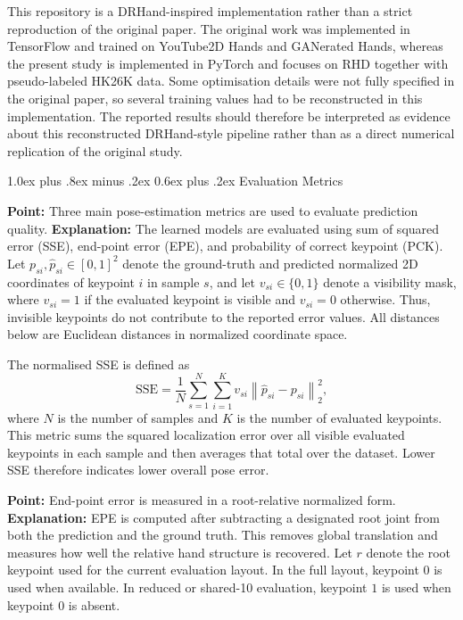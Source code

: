 \documentclass[10pt,letterpaper]{article}
\makeatletter
\renewcommand\subsection{\@startsection{subsection}{2}{\z@}%
  {1.0ex plus .8ex minus .2ex}%
  {0.6ex plus .2ex}%
  {\normalfont\itshape}}
\makeatother
\begin{document}
\noindent This repository is a DRHand-inspired implementation rather than a strict reproduction of the original paper. The original work was implemented in TensorFlow and trained on YouTube2D Hands and GANerated Hands, whereas the present study is implemented in PyTorch and focuses on RHD together with pseudo-labeled HK26K data. Some optimisation details were not fully specified in the original paper, so several training values had to be reconstructed in this implementation. The reported results should therefore be interpreted as evidence about this reconstructed DRHand-style pipeline rather than as a direct numerical replication of the original study.


\subsection{Evaluation Metrics}

\noindent\textbf{Point:} Three main pose-estimation metrics are used to evaluate prediction quality.  
\textbf{Explanation:} The learned models are evaluated using sum of squared error (SSE), end-point error (EPE), and probability of correct keypoint (PCK). Let \(p_{si}, \hat{p}_{si} \in [0,1]^2\) denote the ground-truth and predicted normalized 2D coordinates of keypoint \(i\) in sample \(s\), and let \(v_{si} \in \{0,1\}\) denote a visibility mask, where \(v_{si}=1\) if the evaluated keypoint is visible and \(v_{si}=0\) otherwise. Thus, invisible keypoints do not contribute to the reported error values. All distances below are Euclidean distances in normalized coordinate space.

The normalised SSE is defined as
\[
\mathrm{SSE} =
\frac{1}{N}
\sum_{s=1}^{N}
\sum_{i=1}^{K}
v_{si}\left\|
\hat{p}_{si} - p_{si}
\right\|_2^2,
\]
where \(N\) is the number of samples and \(K\) is the number of evaluated keypoints. This metric sums the squared localization error over all visible evaluated keypoints in each sample and then averages that total over the dataset. Lower SSE therefore indicates lower overall pose error.

\medskip
\noindent\textbf{Point:} End-point error is measured in a root-relative normalized form.  
\textbf{Explanation:} EPE is computed after subtracting a designated root joint from both the prediction and the ground truth. This removes global translation and measures how well the relative hand structure is recovered. Let \(r\) denote the root keypoint used for the current evaluation layout. In the full layout, keypoint \(0\) is used when available. In reduced or shared-10 evaluation, keypoint \(1\) is used when keypoint \(0\) is absent.
\end{document}
